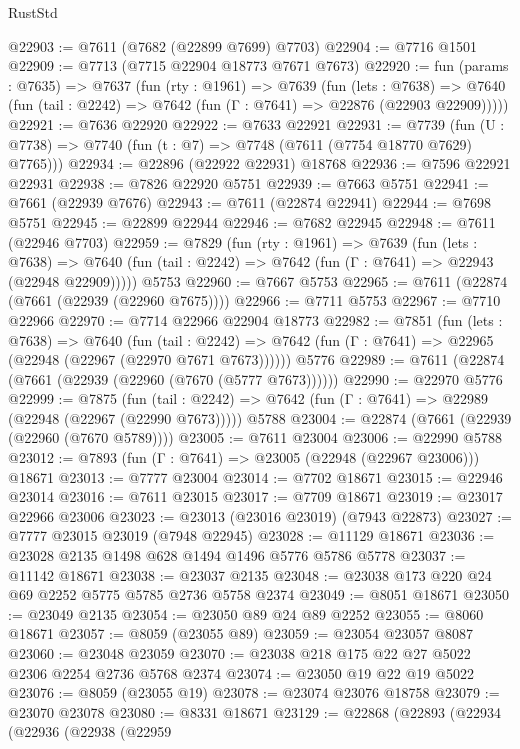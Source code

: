 \begin{lexlean}{RustStd}
\begin{coremodule}
@22903 := @7611 (@7682 (@22899 @7699) @7703)
@22904 := @7716 @1501
@22909 := @7713 (@7715 @22904 @18773 @7671 @7673)
@22920 := fun (params : @7635) =>
  @7637
    (fun (rty : @1961) =>
    @7639
      (fun (lets : @7638) =>
      @7640 (fun (tail : @2242) => @7642 (fun (Γ : @7641) => @22876 (@22903 @22909)))))
@22921 := @7636 @22920
@22922 := @7633 @22921
@22931 := @7739
    (fun (U : @7738) => @7740 (fun (t : @7) => @7748 (@7611 (@7754 @18770 @7629) @7765)))
@22934 := @22896 (@22922 @22931) @18768
@22936 := @7596 @22921 @22931
@22938 := @7826 @22920 @5751
@22939 := @7663 @5751
@22941 := @7661 (@22939 @7676)
@22943 := @7611 (@22874 @22941)
@22944 := @7698 @5751
@22945 := @22899 @22944
@22946 := @7682 @22945
@22948 := @7611 (@22946 @7703)
@22959 := @7829
    (fun (rty : @1961) =>
    @7639
      (fun (lets : @7638) =>
      @7640 (fun (tail : @2242) => @7642 (fun (Γ : @7641) => @22943 (@22948 @22909)))))
    @5753
@22960 := @7667 @5753
@22965 := @7611 (@22874 (@7661 (@22939 (@22960 @7675))))
@22966 := @7711 @5753
@22967 := @7710 @22966
@22970 := @7714 @22966 @22904 @18773
@22982 := @7851
    (fun (lets : @7638) =>
    @7640
      (fun (tail : @2242) =>
      @7642 (fun (Γ : @7641) => @22965 (@22948 (@22967 (@22970 @7671 @7673))))))
    @5776
@22989 := @7611 (@22874 (@7661 (@22939 (@22960 (@7670 (@5777 @7673))))))
@22990 := @22970 @5776
@22999 := @7875
    (fun (tail : @2242) => @7642 (fun (Γ : @7641) => @22989 (@22948 (@22967 (@22990 @7673)))))
    @5788
@23004 := @22874 (@7661 (@22939 (@22960 (@7670 @5789))))
@23005 := @7611 @23004
@23006 := @22990 @5788
@23012 := @7893 (fun (Γ : @7641) => @23005 (@22948 (@22967 @23006))) @18671
@23013 := @7777 @23004
@23014 := @7702 @18671
@23015 := @22946 @23014
@23016 := @7611 @23015
@23017 := @7709 @18671
@23019 := @23017 @22966 @23006
@23023 := @23013 (@23016 @23019) (@7943 @22873)
@23027 := @7777 @23015 @23019 (@7948 @22945)
@23028 := @11129 @18671
@23036 := @23028 @2135 @1498 @628 @1494 @1496 @5776 @5786 @5778
@23037 := @11142 @18671
@23038 := @23037 @2135
@23048 := @23038 @173 @220 @24 @69 @2252 @5775 @5785 @2736 @5758 @2374
@23049 := @8051 @18671
@23050 := @23049 @2135
@23054 := @23050 @89 @24 @89 @2252
@23055 := @8060 @18671
@23057 := @8059 (@23055 @89)
@23059 := @23054 @23057 @8087
@23060 := @23048 @23059
@23070 := @23038 @218 @175 @22 @27 @5022 @2306 @2254 @2736 @5768 @2374
@23074 := @23050 @19 @22 @19 @5022
@23076 := @8059 (@23055 @19)
@23078 := @23074 @23076 @18758
@23079 := @23070 @23078
@23080 := @8331 @18671
@23129 := @22868
    (@22893
      (@22934
        (@22936
          (@22938
            (@22959

\end{coremodule}
\end{lexlean}
